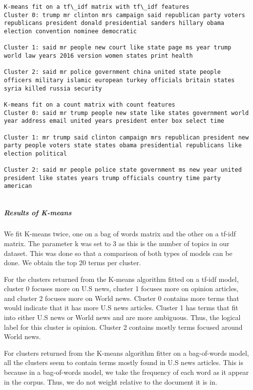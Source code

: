 \documentclass[11pt]{article}
\begin{document}
    \begin{Verbatim}[commandchars=\\\{\}]
K-means fit on a tf\_idf matrix with tf\_idf features
Cluster 0: trump mr clinton mrs campaign said republican party voters republicans president donald presidential sanders hillary obama election convention nominee democratic

Cluster 1: said mr people new court like state page ms year trump world law years 2016 version women states print health

Cluster 2: said mr police government china united state people officers military islamic european turkey officials britain states syria killed russia security

K-means fit on a count matrix with count features
Cluster 0: said mr trump people new state like states government world year address email united years president enter box select time

Cluster 1: mr trump said clinton campaign mrs republican president new party people voters state states obama presidential republicans like election political

Cluster 2: said mr people police state government ms new year united president like states years trump officials country time party american


    \end{Verbatim}

    \subparagraph{Results of K-means}\label{results-of-k-means}

We fit K-means twice, one on a bag of words matrix and the other on a
tf-idf matrix. The parameter k was set to 3 as this is the number of
topics in our dataset. This was done so that a comparison of both types
of models can be done. We obtain the top 20 terms per cluster.

For the clusters returned from the K-means algorithm fitted on a tf-idf
model, cluster 0 focuses more on U.S news, cluster 1 focuses more on
opinion articles, and cluster 2 focuses more on World news. Cluster 0
contains more terms that would indicate that it has more U.S news
articles. Cluster 1 has terms that fit into either U.S news or World
news and are more ambiguous. Thus, the logical label for this cluster is
opinion. Cluster 2 contains mostly terms focused around World news.

For clusters returned from the K-means algorithm fitter on a
bag-of-words model, all the clusters seem to contain terms mostly found
in U.S news articles. This is because in a bag-of-words model, we take
the frequency of each word as it appear in the corpus. Thus, we do not
weight relative to the document it is in.
\end{document}
